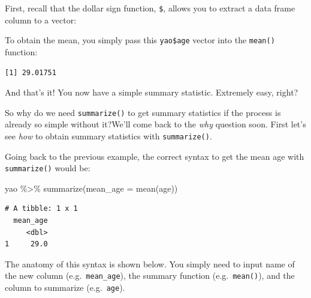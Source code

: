 \documentclass[
  letterpaper,
  DIV=11,
  numbers=noendperiod]{scrreprt}
\newenvironment{Shaded}{\begin{snugshade}}{\end{snugshade}}
\newcommand{\AttributeTok}[1]{\textcolor[rgb]{0.40,0.45,0.13}{#1}}
\newcommand{\CommentTok}[1]{\textcolor[rgb]{0.37,0.37,0.37}{#1}}
\newcommand{\FunctionTok}[1]{\textcolor[rgb]{0.28,0.35,0.67}{#1}}
\newcommand{\NormalTok}[1]{\textcolor[rgb]{0.00,0.23,0.31}{#1}}
\newcommand{\SpecialCharTok}[1]{\textcolor[rgb]{0.37,0.37,0.37}{#1}}
\begin{document}
First, recall that the dollar sign function, \texttt{\$}, allows you to
extract a data frame column to a vector:

\begin{Shaded}
\end{Shaded}

To obtain the mean, you simply pass this \texttt{yao\$age} vector into
the \texttt{mean()} function:

\begin{Shaded}
\end{Shaded}

\begin{verbatim}
[1] 29.01751
\end{verbatim}

And that's it! You now have a simple summary statistic. Extremely easy,
right?

So why do we need \texttt{summarize()} to get summary statistics if the
process is already so simple without it?We'll come back to the
\emph{why} question soon. First let's see \emph{how} to obtain summary
statistics with \texttt{summarize()}.

Going back to the previous example, the correct syntax to get the mean
age with \texttt{summarize()} would be:

\begin{Shaded}
\begin{Highlighting}[]
\NormalTok{yao }\SpecialCharTok{\%\textgreater{}\%} 
  \FunctionTok{summarize}\NormalTok{(}\AttributeTok{mean\_age =} \FunctionTok{mean}\NormalTok{(age))}
\end{Highlighting}
\end{Shaded}

\begin{verbatim}
# A tibble: 1 x 1
  mean_age
     <dbl>
1     29.0
\end{verbatim}

The anatomy of this syntax is shown below. You simply need to input name
of the new column (e.g.~\texttt{mean\_age}), the summary function
(e.g.~\texttt{mean()}), and the column to summarize (e.g.~\texttt{age}).
\end{document}
